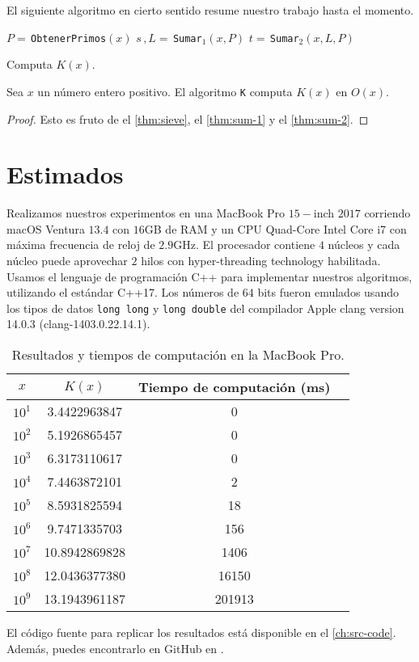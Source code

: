 El siguiente algoritmo en cierto sentido resume nuestro trabajo hasta el momento.

\begin{algorithm}[H]
    \SetAlgoLined
    \DontPrintSemicolon
     {
        \(P = \,\)\texttt{ObtenerPrimos}\((x)\)\;
        \(s \, , L = \,\)\texttt{Sumar}\(_1(x, P)\)\;
        \(t = \,\)\texttt{Sumar}\(_2(x, L, P)\)\;
    }
    \caption{Computa \(K(x)\).}
\end{algorithm}

\begin{theorem}
    Sea \(x\) un n\'umero entero positivo.
    El algoritmo \texttt{K} computa \(K(x)\) en \(O(x)\).
\end{theorem}

\begin{proof}
    Esto es fruto de el \cref{thm:sieve}, el \cref{thm:sum-1} y el \cref{thm:sum-2}.
\end{proof}

\section{Estimados}

Realizamos nuestros experimentos en una
MacBook Pro \(15-\)inch \(2017\)
corriendo macOS Ventura \(13.4\)
con \(16\)GB de RAM y
un CPU Quad-Core Intel Core i7
con m\'axima frecuencia de reloj de \(2.9\)GHz.
El procesador contiene \(4\) n\'ucleos
y cada n\'ucleo puede aprovechar \(2\) hilos
con hyper-threading technology habilitada.
Usamos el lenguaje de programaci\'on C++ para implementar nuestros algoritmos,
utilizando el est\'andar C++17.
Los n\'umeros de \(64\) bits fueron emulados usando los tipos de datos
\texttt{long long} y \texttt{long double} del compilador
Apple clang version 14.0.3 (clang-1403.0.22.14.1).

\begin{table}[htbp]
    \centering
    \caption{Resultados y tiempos de computaci\'on en la MacBook Pro.}
    \begin{tabular}{cccc}
      \toprule
      \textbf{\(x\)} & \textbf{\(K(x)\)} & \textbf{Tiempo de computaci\'on (ms)} \\
      \midrule
      \(10^1\) & 3.4422963847 & 0 \\
      \(10^2\) & 5.1926865457 & 0 \\
      \(10^3\) & 6.3173110617 & 0 \\
      \(10^4\) & 7.4463872101 & 2 \\
      \(10^5\) & 8.5931825594 & 18 \\
      \(10^6\) & 9.7471335703 & 156 \\
      \(10^7\) & 10.8942869828 & 1406 \\
      \(10^8\) & 12.0436377380 & 16150 \\
      \(10^9\) & 13.1943961187 & 201913 \\
      \bottomrule
    \end{tabular}
\end{table}

El c\'odigo fuente para replicar los resultados
está disponible en el \cref{ch:src-code}.
Además, puedes encontrarlo en GitHub en
.